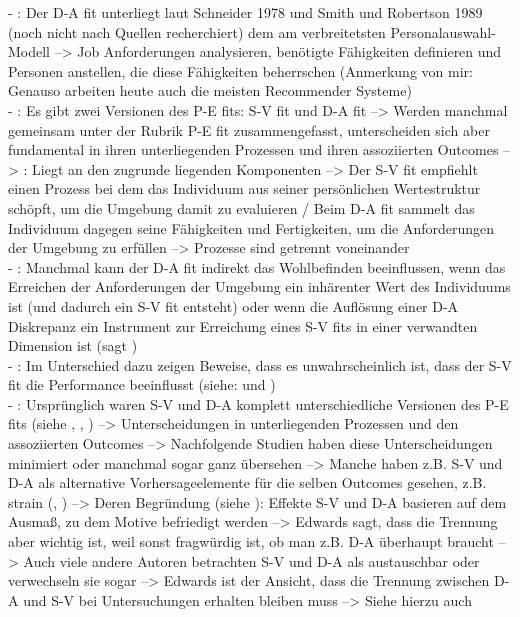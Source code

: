 - \cite[S. 3]{edwards:1990}: Der D-A fit unterliegt laut Schneider 1978 und Smith und Robertson 1989 (noch nicht nach Quellen recherchiert) dem am verbreitetsten Personalauswahl-Modell --> Job Anforderungen analysieren, benötigte Fähigkeiten definieren und Personen anstellen, die diese Fähigkeiten beherrschen (Anmerkung von mir: Genauso arbeiten heute auch die meisten Recommender Systeme) \\
- \cite[S. 3f.]{edwards:1990}: Es gibt zwei Versionen des P-E fits: S-V fit und D-A fit --> Werden manchmal gemeinsam unter der Rubrik P-E fit zusammengefasst, unterscheiden sich aber fundamental in ihren unterliegenden Prozessen und ihren assoziierten Outcomes --> \cite[S. 4]{edwards:1990}: Liegt an den zugrunde liegenden Komponenten --> Der S-V fit empfiehlt einen Prozess bei dem das Individuum aus seiner persönlichen Wertestruktur schöpft, um die Umgebung damit zu evaluieren / Beim D-A fit sammelt das Individuum dagegen seine Fähigkeiten und Fertigkeiten, um die Anforderungen der Umgebung zu erfüllen --> Prozesse sind getrennt voneinander \\
- \cite[S. 4]{edwards:1990}: Manchmal kann der D-A fit indirekt das Wohlbefinden beeinflussen, wenn das Erreichen der Anforderungen der Umgebung ein inhärenter Wert des Individuums ist (und dadurch ein S-V fit entsteht) oder wenn die Auflösung einer D-A Diskrepanz ein Instrument zur Erreichung eines S-V fits in einer verwandten Dimension ist (sagt \textcite{mechanismsOfJobStressAndStrain:1982}) \\
- \cite[S. 4]{edwards:1990}: Im Unterschied dazu zeigen Beweise, dass es unwahrscheinlich ist, dass der S-V fit die Performance beeinflusst (siehe: \textcite{greene:1972} und \textcite{schwabCummings:1970}) \\
- \cite[S. 4]{edwards:1990}: Ursprünglich waren S-V und D-A komplett unterschiedliche Versionen des P-E fits (siehe \textcite{copingAndAdaption:1974}, \textcite{mechanismsOfJobStressAndStrain:1982}, \textcite{harrison:1978}) --> Unterscheidungen in unterliegenden Prozessen und den assoziierten Outcomes --> Nachfolgende Studien haben diese Unterscheidungen minimiert oder manchmal sogar ganz übersehen --> Manche haben z.B. S-V und D-A als alternative Vorhersageelemente für die selben Outcomes gesehen, z.B. strain (\textcite{jobDemandsAndWorkerHealth:1975}, \textcite{mechanismsOfJobStressAndStrain:1982}) --> Deren Begründung (siehe \textcite[S. 31]{mechanismsOfJobStressAndStrain:1982}): Effekte S-V und D-A basieren auf dem Ausmaß, zu dem Motive befriedigt werden --> Edwards sagt, dass die Trennung aber wichtig ist, weil sonst fragwürdig ist, ob man z.B. D-A überhaupt braucht --> Auch viele andere Autoren betrachten S-V und D-A als austauschbar oder verwechseln sie sogar  --> Edwards ist der Ansicht, dass die Trennung zwischen D-A und S-V bei Untersuchungen erhalten bleiben muss --> Siehe hierzu auch \textcite{mechanismsOfJobStressAndStrain:1982} \\
